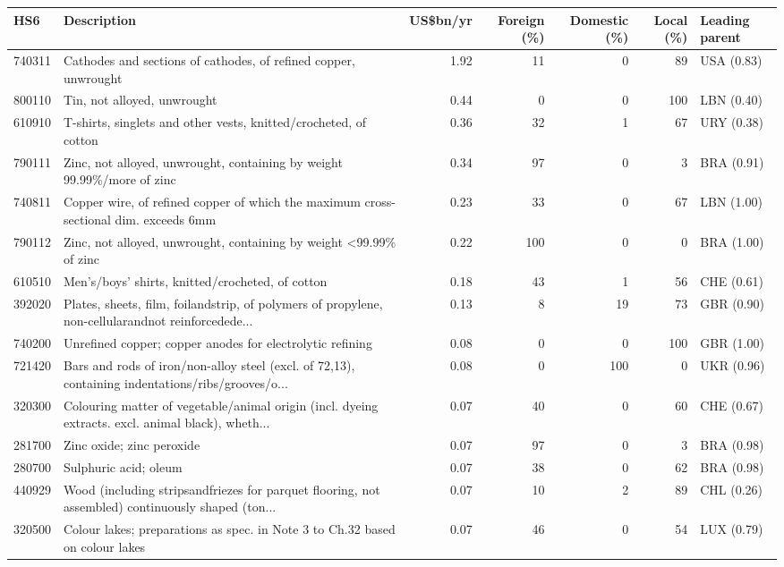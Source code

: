 \begin{tabular}{@{}l p{6.4cm} r r r r l@{}}
\toprule
HS6 & Description & US\$bn/yr & Foreign (\%) & Domestic (\%) & Local (\%) & Leading parent \\
\midrule
740311 & Cathodes and sections of cathodes, of refined copper, unwrought & 1.92 & 11 & 0 & 89 & USA (0.83) \\
800110 & Tin, not alloyed, unwrought & 0.44 & 0 & 0 & 100 & LBN (0.40) \\
610910 & T-shirts, singlets and other vests, knitted/\allowbreak{}crocheted, of cotton & 0.36 & 32 & 1 & 67 & URY (0.38) \\
790111 & Zinc, not alloyed, unwrought, containing by weight 99.99\%/\allowbreak{}more of zinc & 0.34 & 97 & 0 & 3 & BRA (0.91) \\
740811 & Copper wire, of refined copper of which the maximum cross-sectional dim. exceeds 6mm & 0.23 & 33 & 0 & 67 & LBN (1.00) \\
790112 & Zinc, not alloyed, unwrought, containing by weight <99.99\% of zinc & 0.22 & 100 & 0 & 0 & BRA (1.00) \\
610510 & Men's/\allowbreak{}boys' shirts, knitted/\allowbreak{}crocheted, of cotton & 0.18 & 43 & 1 & 56 & CHE (0.61) \\
392020 & Plates, sheets, film, foilandstrip, of polymers of propylene, non-cellularandnot reinforcedede... & 0.13 & 8 & 19 & 73 & GBR (0.90) \\
740200 & Unrefined copper; copper anodes for electrolytic refining & 0.08 & 0 & 0 & 100 & GBR (1.00) \\
721420 & Bars and rods of iron/\allowbreak{}non-alloy steel (excl. of 72,13), containing indentations/\allowbreak{}ribs/\allowbreak{}grooves/\allowbreak{}o... & 0.08 & 0 & 100 & 0 & UKR (0.96) \\
320300 & Colouring matter of vegetable/\allowbreak{}animal origin (incl. dyeing extracts. excl. animal black), wheth... & 0.07 & 40 & 0 & 60 & CHE (0.67) \\
281700 & Zinc oxide; zinc peroxide & 0.07 & 97 & 0 & 3 & BRA (0.98) \\
280700 & Sulphuric acid; oleum & 0.07 & 38 & 0 & 62 & BRA (0.98) \\
440929 & Wood (including stripsandfriezes for parquet flooring, not assembled) continuously shaped (ton... & 0.07 & 10 & 2 & 89 & CHL (0.26) \\
320500 & Colour lakes; preparations as spec. in Note 3 to Ch.32 based on colour lakes & 0.07 & 46 & 0 & 54 & LUX (0.79) \\
\bottomrule
\end{tabular}
